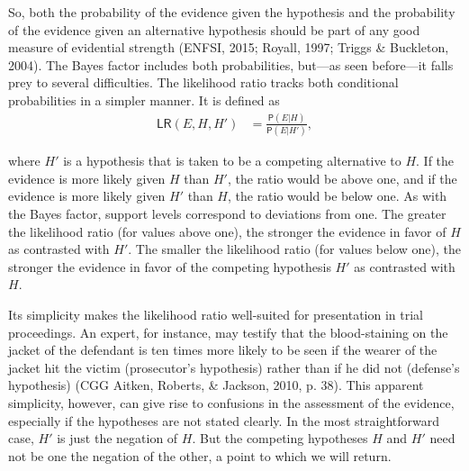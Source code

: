 \documentclass[
  10pt,
  dvipsnames,enabledeprecatedfontcommands]{scrartcl}
\newcommand{\pr}[1]{\mathsf{P}(#1)}
\begin{document}
So, both the probability of the evidence given the hypothesis and the
probability of the evidence given an alternative hypothesis should be
part of any good measure of evidential strength (ENFSI, 2015; Royall,
1997; Triggs \& Buckleton, 2004). The Bayes factor includes both
probabilities, but---as seen before---it falls prey to several
difficulties. The likelihood ratio tracks both conditional probabilities
in a simpler manner. It is defined as \begin{align*}
\mathsf{LR}(E,H,H') & = \frac{\pr{E \vert H}}{\pr{E \vert H'}},
\end{align*}

\noindent where \(H'\) is a hypothesis that is taken to be a competing
alternative to \(H\). If the evidence is more likely given \(H\) than
\(H'\), the ratio would be above one, and if the evidence is more likely
given \(H'\) than \(H\), the ratio would be below one. As with the Bayes
factor, support levels correspond to deviations from one. The greater
the likelihood ratio (for values above one), the stronger the evidence
in favor of \(H\) as contrasted with \(H'\). The smaller the likelihood
ratio (for values below one), the stronger the evidence in favor of the
competing hypothesis \(H'\) as contrasted with \(H\).

Its simplicity makes the likelihood ratio well-suited for presentation
in trial proceedings. An expert, for instance, may testify that the
blood-staining on the jacket of the defendant is ten times more likely
to be seen if the wearer of the jacket hit the victim (prosecutor's
hypothesis) rather than if he did not (defense's hypothesis) (CGG
Aitken, Roberts, \& Jackson, 2010, p. 38). This apparent simplicity,
however, can give rise to confusions in the assessment of the evidence,
especially if the hypotheses are not stated clearly. In the most
straightforward case, \(H'\) is just the negation of \(H\). But the
competing hypotheses \(H\) and \(H'\) need not be one the negation of
the other, a point to which we will return.
\end{document}
